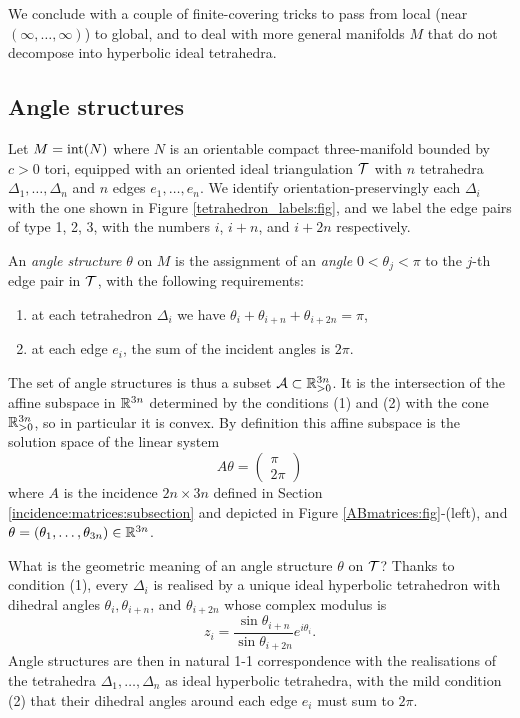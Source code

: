 We conclude with a couple of finite-covering tricks to pass from local (near $(\infty, \ldots, \infty)$) to global, and to deal with more general manifolds $M$ that do not decompose into hyperbolic ideal tetrahedra.

\subsection{Angle structures}
Let $M= {\rm int}(N)$ where $N$ is an orientable compact three-manifold bounded by $c>0$ tori, equipped with an oriented ideal triangulation $\mathcal{T}$ with $n$ tetrahedra $\Delta_1,\ldots, \Delta_n$ and $n$ edges $e_1,\ldots, e_n$. We identify orientation-preservingly each $\Delta_i$ with the one shown in Figure \ref{tetrahedron_labels:fig}, and we label the edge pairs of type 1, 2, 3, with the numbers $i$, $i+n$, and $i+2n$ respectively.

An \emph{angle structure} $\theta$ on $M$ is the assignment of an \emph{angle} $0< \theta_j < \pi$ to the $j$-th edge pair in $\mathcal{T}$, with the following requirements:
\begin{enumerate}
\item at each tetrahedron $\Delta_i$ we have $\theta_i + \theta_{i+n} + \theta_{i+2n} = \pi$,
\item at each edge $e_i$, the sum of the incident angles is $2\pi$.
\end{enumerate}
The set of angle structures is thus a subset $\mathcal{A} \subset \mathbb{R}_{>0}^{3n}$. It is the intersection of the affine subspace in $\mathbb{R}^{3n}$ determined by the conditions (1) and (2) with the cone $\mathbb{R}_{>0}^{3n}$, so in particular it is convex. By definition this affine subspace is the solution space of the linear system
$$A\theta = \begin{pmatrix} \pi \\ 2\pi \end{pmatrix}$$
where $A$ is the incidence $2n \times 3n$ defined in Section \ref{incidence:matrices:subsection} and depicted in Figure \ref{ABmatrices:fig}-(left), and $\theta = (\theta_1, \ldots, \theta_{3n})\in \mathbb{R}^{3n}$.

What is the geometric meaning of an angle structure $\theta$ on $\mathcal{T}$? Thanks to condition (1), every $\Delta_i$ is realised by a unique ideal hyperbolic tetrahedron with dihedral angles $\theta_i, \theta_{i+n}$, and $\theta_{i+2n}$ whose complex modulus is
\begin{equation} \label{theta:z:eqn}
z_i = \frac{\sin \theta_{i+n}}{\sin \theta_{i+2n}}e^{i\theta_i}.
\end{equation}
Angle structures are then in natural 1-1 correspondence with the realisations of the tetrahedra $\Delta_1,\dots, \Delta_n$ as ideal hyperbolic tetrahedra, with the mild condition (2) that their dihedral angles around each edge $e_i$ must sum to $2\pi$. 

